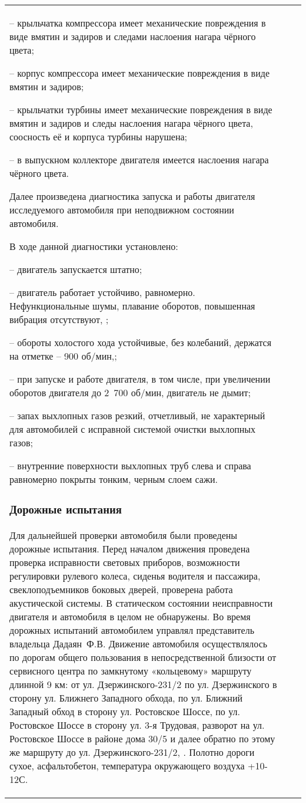 {\begin{longtable}{G{25mm}|M{44mm}|G{70mm}}
-- крыльчатка компрессора имеет механические повреждения в виде вмятин и задиров и следами наслоения нагара чёрного цвета;

-- корпус компрессора имеет механические повреждения в виде вмятин и задиров;

-- крыльчатки турбины имеет механические повреждения в виде вмятин и задиров и следы наслоения нагара чёрного цвета, соосность её и корпуса турбины нарушена;

-- в выпускном коллекторе двигателя имеется наслоения нагара чёрного цвета.




Далее произведена диагностика запуска и работы двигателя исследуемого автомобиля при неподвижном состоянии  автомобиля. 

В ходе данной диагностики установлено:

-- двигатель запускается штатно;

-- двигатель работает устойчиво, равномерно. Нефункциональные шумы, плавание оборотов, повышенная вибрация отсутствуют, ;

-- обороты холостого хода устойчивые, без колебаний, держатся на отметке – 900 об/мин,;

-- при запуске и работе двигателя, в том числе, при увеличении оборотов двигателя до 2 700 об/мин, двигатель не дымит;

-- запах выхлопных газов резкий, отчетливый, не характерный для автомобилей с исправной системой очистки выхлопных газов;

-- внутренние поверхности выхлопных труб слева и справа равномерно покрыты тонким, черным слоем сажи.
 	         	

\subsubsection{Дорожные испытания}
 
 Для дальнейшей проверки автомобиля были проведены дорожные испытания. Перед началом движения  проведена проверка исправности световых приборов, возможности регулировки рулевого колеса, сиденья водителя и пассажира, свеклоподъемников боковых дверей, проверена работа акустической системы. В статическом состоянии неисправности двигателя и  автомобиля в целом не обнаружены. Во время дорожных испытаний  автомобилем управлял представитель владельца Дадаян~Ф.В. Движение автомобиля осуществлялось по дорогам общего пользования в непосредственной близости от  сервисного центра по замкнутому «кольцевому» маршруту длинной 9 км: от ул. Дзержинского-231/2 по ул. Дзержинского в сторону ул. Ближнего Западного обхода, по ул. Ближний Западный обход в сторону ул. Ростовское Шоссе, по ул. Ростовское Шоссе в сторону ул. 3-я Трудовая, разворот на ул. Ростовское Шоссе в районе дома 30/5 и далее обратно по этому же маршруту до ул. Дзержинского-231/2, .  Полотно дороги сухое, асфальтобетон, температура окружающего воздуха +10-12 С. 
   

\end{longtable}}
